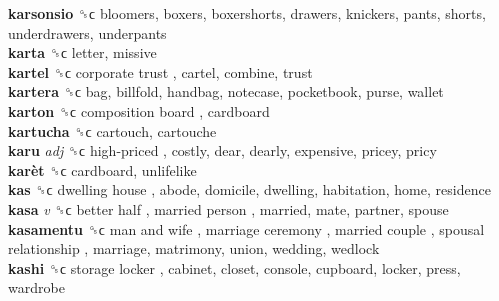 \textbf{karsonsio} ␝ϲ  bloomers, boxers, boxershorts, drawers, knickers, pants, shorts, underdrawers, underpants  \\
\textbf{karta} ␝ϲ  letter, missive  \\
\textbf{kartel} ␝ϲ   corporate trust , cartel, combine, trust  \\
\textbf{kartera} ␝ϲ  bag, billfold, handbag, notecase, pocketbook, purse, wallet  \\
\textbf{karton} ␝ϲ   composition board , cardboard  \\
\textbf{kartucha} ␝ϲ  cartouch, cartouche  \\
\textbf{karu} \emph{adj}  ␝ϲ   high-priced , costly, dear, dearly, expensive, pricey, pricy  \\
\textbf{karèt} ␝ϲ  cardboard, unlifelike  \\
\textbf{kas} ␝ϲ   dwelling house , abode, domicile, dwelling, habitation, home, residence  \\
\textbf{kasa} \emph{v}  ␝ϲ   better half ,  married person , married, mate, partner, spouse  \\
\textbf{kasamentu} ␝ϲ   man and wife ,  marriage ceremony ,  married couple ,  spousal relationship , marriage, matrimony, union, wedding, wedlock  \\
\textbf{kashi} ␝ϲ   storage locker , cabinet, closet, console, cupboard, locker, press, wardrobe  \\
